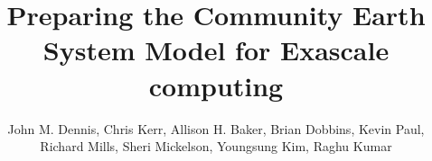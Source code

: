\documentclass[graybox]{svmult}
\begin{document}


\title*{Preparing the Community Earth System Model  for Exascale computing}
\author{John M. Dennis, Chris Kerr, Allison H. Baker, Brian Dobbins, Kevin Paul, Richard Mills,
  Sheri Mickelson, Youngsung Kim, Raghu Kumar}


%
%
%

        
\maketitle





%
%
\end{document}
